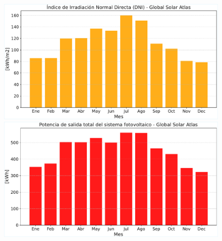 \begin{figure}[ht!]
    \centering
    \begin{minipage}{0.47\textwidth}
        \centering
        \includegraphics[width=\linewidth]{fig/06_fault_sg/fault_sg_02a.pdf}
    \end{minipage}
    \hfill
    \begin{minipage}{0.47\textwidth}
        \centering
        \includegraphics[width=\linewidth]{fig/06_fault_sg/fault_sg_02b.pdf}
    \end{minipage}
    
    \vspace{0.5cm} %
    

\end{figure}

